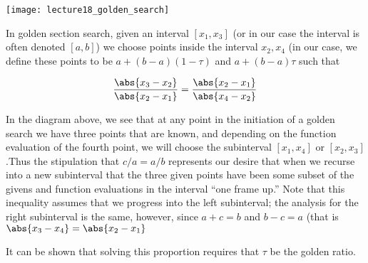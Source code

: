 \documentclass[../main.tex]{subfiles}
\begin{document}
\begin{definition}
\begin{center}
    \texttt{[image: lecture18\_golden\_search]}
\end{center}

In golden section search,  given an interval $[x_1 , x_3]$ (or in our case the interval is often denoted $[a,b]$) we choose points inside the interval $x_2, x_4$ (in our case, we define these points to be $a + (b - a)(1 - \tau)$ and $a + (b - a)\tau$ such that

\[
    \frac{\abs{x_3 - x_2}}{\abs{x_2 - x_1}} = \frac{\abs{x_2 - x_1}}{\abs{x_4 - x_2}}
\]

In the diagram above, we see that at any point in the initiation of a golden search we have three points that are known, and depending on the function evaluation of the fourth point, we will choose the subinterval $[x_1, x_4]$ or $[x_2, x_3]$.Thus the stipulation that $c/a = a/b$ represents our desire that when we recurse into a new subinterval that the three given points have been some subset of the givens and function evaluations in the interval ``one frame up.'' Note that this inequality assumes that we progress into the left subinterval; the analysis for the right subinterval is the same, however, since $a + c = b$ and $b -c = a$ (that is $\abs{x_3 - x_4} = \abs{x_2 - x_1}$

It can be shown that solving this proportion requires that $\tau$ be the golden ratio.


    
\end{definition}
\end{document}

